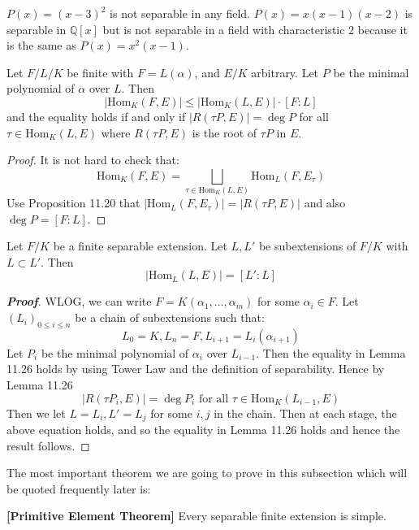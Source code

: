 $P(x)=(x-3)^2$ is not separable in any field. $P(x)=x(x-1)(x-2)$ is separable in $\mathbb{Q}[x]$ but is not separable in a field with characteristic $2$ because it is the same as $P(x)=x^2(x-1)$.
\begin{lemma} Let $F/L/K$ be finite with $F = L(\alpha)$, and $E/K$ arbitrary. Let $P$ be the
minimal polynomial of $\alpha$ over $L$. Then $$|\text{Hom}_K(F,E)| \le |\text{Hom}_K(L,E)| \cdot [F : L]$$ and
the equality holds if and only if $|R(\tau P,E)| = \deg{P}$ for all $\tau \in \text{Hom}_K(L,E)$ where
$R(\tau P,E)$ is the root of $\tau P$ in $E$.
\end{lemma}
\begin{proof}
It is not hard to check that:
$$\text{Hom}_K(F,E) =\bigsqcup_{\tau \in \text{Hom}_K(L,E)}\text{Hom}_L(F,E_\tau)$$
Use Proposition 11.20 that $|\text{Hom}_L(F,E_\tau )|= |R(\tau P,E)|$ and also $\deg{P} =[F:L]$.
\end{proof}
\begin{lemma} Let $F/K$ be a finite separable extension. Let $L,L'$ be subextensions of $F/K$ with $L \subset L'$. Then
$$\left|\text{Hom}_L(L,E)\right|=[L':L]$$
\end{lemma}
\begin{proof}[\bf Proof] WLOG, we can write $F=K(\alpha_1,\ldots,\alpha_m)$ for some $\alpha_i \in F$.
Let $(L_i)_{0 \le i \le n}$ be a chain of subextensions such that:
$$L_0=K, L_n=F, L_{i+1}=L_i(\alpha_{i+1})$$
Let $P_i$ be the minimal polynomial of $\alpha_i$ over $L_{i-1}$. Then the equality in Lemma 11.26 holds by using Tower Law and the definition of separability. Hence by Lemma 11.26
$$\left|R(\tau P_i,E)\right| = \deg{P_i} \text{ for all } \tau \in \text{Hom}_K(L_{i-1},E)$$
Then we let $L=L_i,L'=L_j$ for some $i,j$ in the chain. Then at each stage, the above equation holds, and so the equality in Lemma 11.26 holds and hence the result follows.
\end{proof}
The most important theorem we are going to prove in this subsection which will be quoted frequently later is:
\begin{theorem}{\bf [Primitive Element Theorem]}\label{P;Primitive element} Every separable finite extension is simple.
\end{theorem}
